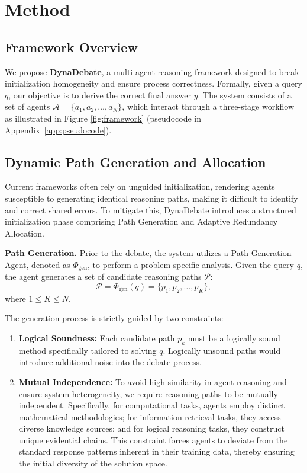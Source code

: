 \section{Method}
\label{sec:method}
\subsection{Framework Overview}
\label{sec:overview}

We propose \textbf{DynaDebate}, a multi-agent reasoning framework designed to break initialization homogeneity and ensure process correctness. Formally, given a query $q$, our objective is to derive the correct final answer $y$. The system consists of a set of agents $\mathcal{A} = \{a_1, a_2, \dots, a_N\}$, which interact through a three-stage workflow as illustrated in Figure \ref{fig:framework} (pseudocode in Appendix~\ref{app:pseudocode}).

\subsection{Dynamic Path Generation and Allocation}
\label{sec:path_gen}

Current frameworks often rely on unguided initialization, rendering agents susceptible to generating identical reasoning paths, making it difficult to identify and correct shared errors. To mitigate this, DynaDebate introduces a structured initialization phase comprising Path Generation and Adaptive Redundancy Allocation.

\textbf{Path Generation.}
Prior to the debate, the system utilizes a Path Generation Agent, denoted as $\Phi_{\text{gen}}$, to perform a problem-specific analysis. Given the query $q$, the agent generates a set of candidate reasoning paths $\mathcal{P}$:
\begin{equation}
\mathcal{P} = \Phi_{\text{gen}}(q) = \{p_1, p_2, \ldots, p_K\},
\end{equation}
where $1 \le K \le N$.

The generation process is strictly guided by two constraints:
\begin{enumerate}
    \item \textbf{Logical Soundness:} Each candidate path $p_k$ must be a logically sound method specifically tailored to solving $q$. Logically unsound paths would introduce additional noise into the debate process.
    \item \textbf{Mutual Independence:} To avoid high similarity in agent reasoning and ensure system heterogeneity, we require reasoning paths to be mutually independent. Specifically, for computational tasks, agents employ distinct mathematical methodologies; for information retrieval tasks, they access diverse knowledge sources; and for logical reasoning tasks, they construct unique evidential chains. This constraint forces agents to deviate from the standard response patterns inherent in their training data, thereby ensuring the initial diversity of the solution space.
\end{enumerate}

